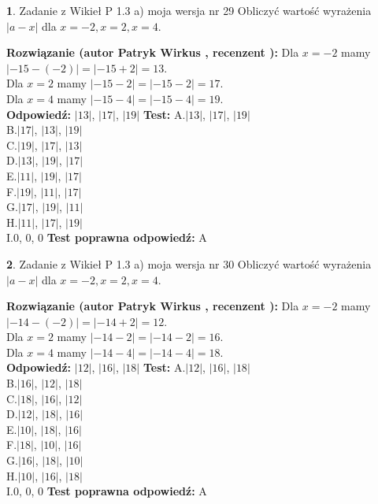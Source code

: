 \documentclass[12pt, a4paper]{article}
\theoremstyle{definition} %
\newtheorem{zad}{}
\newcommand{\zadStart}[1]{\begin{zad}#1\newline}
\newcommand{\zadStop}{\end{zad}}
\newcommand{\rozwStart}[2]{\noindent \textbf{Rozwiązanie (autor #1 , recenzent #2): }\newline}
\newcommand{\rozwStop}{\newline}
\newcommand{\odpStart}{\noindent \textbf{Odpowiedź:}\newline}
\newcommand{\odpStop}{\newline}
\newcommand{\testStart}{\noindent \textbf{Test:}\newline}
\newcommand{\testStop}{\newline}
\newcommand{\kluczStart}{\noindent \textbf{Test poprawna odpowiedź:}\newline}
\newcommand{\kluczStop}{\newline}
\begin{document}
\zadStart{Zadanie z Wikieł P 1.3 a) moja wersja nr 29}
Obliczyć wartość wyrażenia $|a - x|$ dla $x=-2,x=2,x=4$.
\zadStop
\rozwStart{Patryk Wirkus}{}
Dla $x = -2$ mamy $|-15 - (-2)| = |-15 + 2| = 13$.\\
Dla $x = 2$ mamy $|-15 - 2| = |-15 - 2| = 17$.\\
Dla $x = 4$ mamy $|-15 - 4| = |-15 - 4| = 19$.\\
\rozwStop
\odpStart
$|13|$, $|17|$, $|19|$
\odpStop
\testStart
A.$|13|$, $|17|$, $|19|$\\
B.$|17|$, $|13|$, $|19|$\\
C.$|19|$, $|17|$, $|13|$\\
D.$|13|$, $|19|$, $|17|$\\
E.$|11|$, $|19|$, $|17|$\\
F.$|19|$, $|11|$, $|17|$\\
G.$|17|$, $|19|$, $|11|$\\
H.$|11|$, $|17|$, $|19|$\\
I.$0$, $0$, $0$
\testStop
\kluczStart
A
\kluczStop



\zadStart{Zadanie z Wikieł P 1.3 a) moja wersja nr 30}
Obliczyć wartość wyrażenia $|a - x|$ dla $x=-2,x=2,x=4$.
\zadStop
\rozwStart{Patryk Wirkus}{}
Dla $x = -2$ mamy $|-14 - (-2)| = |-14 + 2| = 12$.\\
Dla $x = 2$ mamy $|-14 - 2| = |-14 - 2| = 16$.\\
Dla $x = 4$ mamy $|-14 - 4| = |-14 - 4| = 18$.\\
\rozwStop
\odpStart
$|12|$, $|16|$, $|18|$
\odpStop
\testStart
A.$|12|$, $|16|$, $|18|$\\
B.$|16|$, $|12|$, $|18|$\\
C.$|18|$, $|16|$, $|12|$\\
D.$|12|$, $|18|$, $|16|$\\
E.$|10|$, $|18|$, $|16|$\\
F.$|18|$, $|10|$, $|16|$\\
G.$|16|$, $|18|$, $|10|$\\
H.$|10|$, $|16|$, $|18|$\\
I.$0$, $0$, $0$
\testStop
\kluczStart
A
\kluczStop
\end{document}
